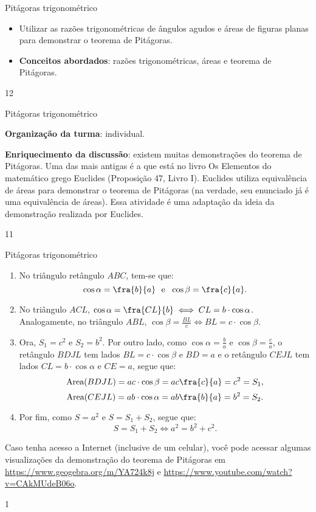 \begin{objectives}{Pitágoras trigonométrico}
{
\begin{itemize}
\item Utilizar as razões trigonométricas de ângulos agudos e áreas de figuras planas para demonstrar o teorema de Pitágoras.
\item \textbf{Conceitos abordados}: razões trigonométricas, áreas e teorema de Pitágoras.
\end{itemize}
}{1}{2}
\end{objectives}
\begin{sugestions}{Pitágoras trigonométrico}
{
\textbf{Organização da turma}: individual.

\textbf{Enriquecimento da discussão}: existem muitas demonstrações do teorema de Pitágoras. Uma das mais antigas é a que está no livro Os Elementos do matemático grego Euclides (Proposição 47, Livro I). Euclides utiliza  equivalência de áreas para demonstrar o teorema de Pitágoras (na verdade, seu enunciado já é uma equivalência de áreas). Essa atividade é uma adaptação da ideia da demonstração realizada por Euclides.

}{1}{1}
\end{sugestions}
\begin{answer}{Pitágoras trigonométrico}
{
\begin{enumerate}
    \item{} 
    No  triângulo retângulo $ABC$, tem-se que:
    $$\cos \alpha=\fra{b}{a} \ \ \text{e} \ \ \cos \beta=\fra{c}{a}.$$
   
    \item{}
    No triângulo $ACL$, $\cos \alpha=\fra{CL}{b} \iff CL=b\cdot\cos \alpha$. Analogamente, no triângulo $ABL$, 
    $\cos \beta=\frac{BL}{c} \iff BL=c\cdot\cos \beta$.
    
    \item{} 
    Ora, $S_1=c^2$ e $S_2=b^2$. Por outro lado, como $\cos \alpha=\frac{b}{a}$ e  $\cos\beta=\frac{c}{a}$, 
    o retângulo $BDJL$ tem lados $BL=c\cdot\cos \beta$ e $BD=a$ e o retângulo $CEJL$ tem lados $CL=b\cdot\cos\alpha$ e $CE=a$, segue que:
    $$\text{Area}(BDJL)=ac\cdot\cos\beta=ac\fra{c}{a}=c^2=S_1,$$
    $$\text{Area}(CEJL)=ab\cdot\cos\alpha=ab\fra{b}{a}=b^2=S_2.$$
    
    \item{}
    Por fim, como $S=a^2$ e $S=S_1+S_2$, segue que:
    $$S=S_1+S_2 \iff a^2=b^2+c^2.$$
\end{enumerate}

Caso tenha acesso a Internet (inclusive de um celular), você pode acessar algumas visualizações da demonstração do teorema de Pitágoras em 
\url{https://www.geogebra.org/m/YA724k8j} e 
\url{https://www.youtube.com/watch?v=CAkMUdeB06o}.
}{1}
\end{answer}
